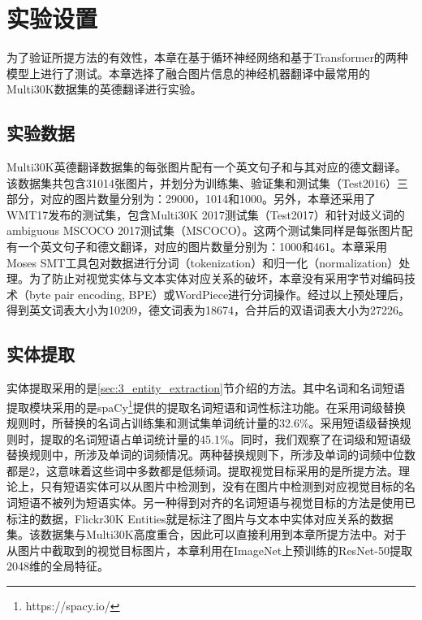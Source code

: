 \section{实验设置}
为了验证所提方法的有效性，本章在基于循环神经网络和基于Transformer的两种模型上进行了测试。本章选择了融合图片信息的神经机器翻译中最常用的Multi30K数据集的英德翻译进行实验。

\subsection{实验数据}
Multi30K英德翻译数据集的每张图片配有一个英文句子和与其对应的德文翻译。该数据集共包含31014张图片，并划分为训练集、验证集和测试集（Test2016）三部分，对应的图片数量分别为：29000，1014和1000。另外，本章还采用了WMT17发布的测试集，包含Multi30K 2017测试集（Test2017）和针对歧义词的ambiguous MSCOCO 2017测试集（MSCOCO）。这两个测试集同样是每张图片配有一个英文句子和德文翻译，对应的图片数量分别为：1000和461。本章采用Moses SMT工具包对数据进行分词（tokenization）和归一化（normalization）处理。为了防止对视觉实体与文本实体对应关系的破坏，本章没有采用字节对编码技术（byte pair encoding, BPE）或WordPiece进行分词操作。经过以上预处理后，得到英文词表大小为10209，德文词表为18674，合并后的双语词表大小为27226。

\subsection{实体提取}
\label{sec:3_setup_entity_extraction}
实体提取采用的是\ref{sec:3_entity_extraction}节介绍的方法。其中名词和名词短语提取模块采用的是spaCy\footnote{https://spacy.io/}提供的提取名词短语和词性标注功能。在采用词级替换规则时，所替换的名词占训练集和测试集单词统计量的32.6\%。采用短语级替换规则时，提取的名词短语占单词统计量的45.1\%。同时，我们观察了在词级和短语级替换规则中，所涉及单词的词频情况。两种替换规则下，所涉及单词的词频中位数都是2，这意味着这些词中多数都是低频词。提取视觉目标采用的是所提方法。理论上，只有短语实体可以从图片中检测到，没有在图片中检测到对应视觉目标的名词短语不被列为短语实体。另一种得到对齐的名词短语与视觉目标的方法是使用已标注的数据，Flickr30K Entities就是标注了图片与文本中实体对应关系的数据集。该数据集与Multi30K高度重合，因此可以直接利用到本章所提方法中。对于从图片中截取到的视觉目标图片，本章利用在ImageNet上预训练的ResNet-50提取2048维的全局特征。

